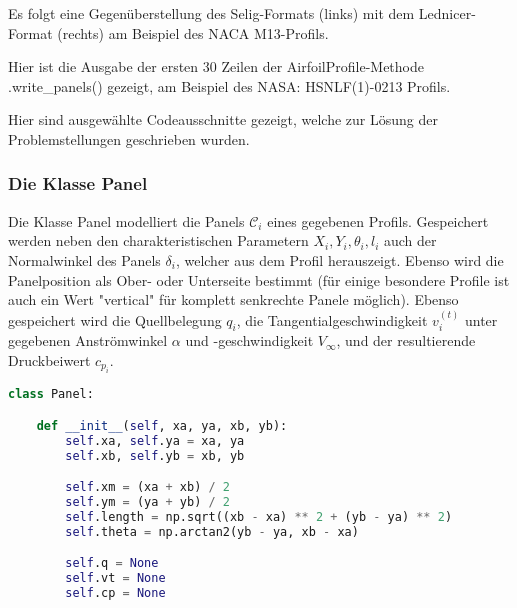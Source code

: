 \appendix

\label{appendix:a}

Es folgt eine Gegenüberstellung des Selig-Formats (links) mit dem Lednicer-Format (rechts) am Beispiel des NACA M13-Profils.

\begin{minipage}{0.45\textwidth}

\end{minipage}
    \hfill
\begin{minipage}{0.45\textwidth}

\end{minipage}

\newpage
{}
\label{appendix:b}
Hier ist die Ausgabe der ersten 30 Zeilen der AirfoilProfile-Methode .write\_panels() gezeigt, am Beispiel des NASA: HSNLF(1)-0213 Profils.



\newpage
{}
\label{appendix:c}
Hier sind ausgewählte Codeausschnitte gezeigt, welche zur Lösung der Problemstellungen geschrieben wurden.
\subsubsection{Die Klasse Panel}
Die Klasse Panel modelliert die Panels $\mathcal{C}_i$ eines gegebenen Profils. Gespeichert werden neben den charakteristischen Parametern $X_i, Y_i, \theta _i, l_i$ auch der Normalwinkel des Panels $\delta_i$, welcher aus dem Profil herauszeigt. Ebenso wird die Panelposition als Ober- oder Unterseite bestimmt (für einige besondere Profile ist auch ein Wert "vertical" für komplett senkrechte Panele möglich). Ebenso gespeichert wird die Quellbelegung $q_i$, die Tangentialgeschwindigkeit $v_i^{(t)}$ unter gegebenen Anströmwinkel $\alpha $ und -geschwindigkeit $V_{\infty}$, und der resultierende Druckbeiwert $c_{p_i}$.
\begin{lstlisting}[language=Python]
class Panel:

    def __init__(self, xa, ya, xb, yb):
        self.xa, self.ya = xa, ya
        self.xb, self.yb = xb, yb

        self.xm = (xa + xb) / 2
        self.ym = (ya + yb) / 2
        self.length = np.sqrt((xb - xa) ** 2 + (yb - ya) ** 2)
        self.theta = np.arctan2(yb - ya, xb - xa)

        self.q = None
        self.vt = None
        self.cp = None
\end{lstlisting}

